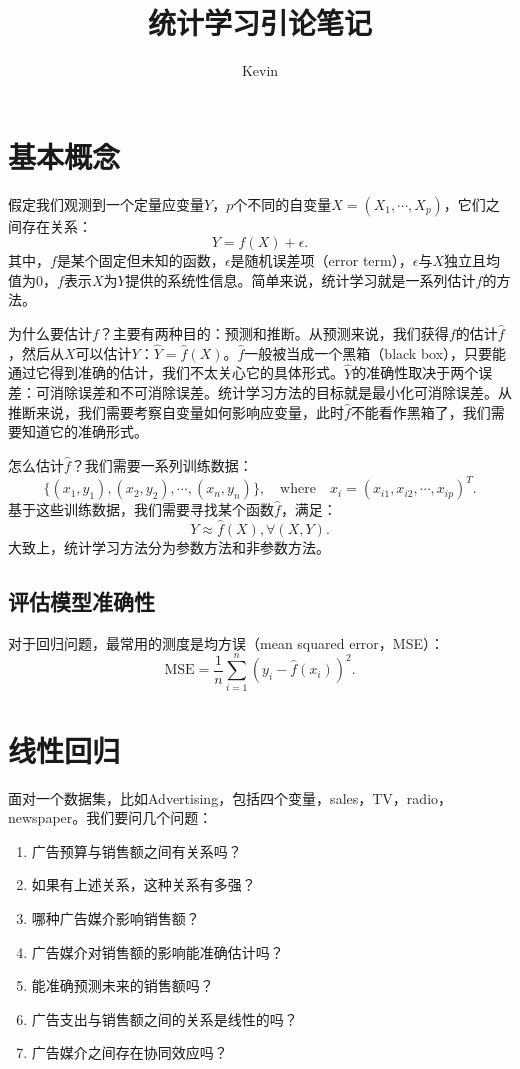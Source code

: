 \documentclass[hyperref,]{ctexart}
\title{统计学习引论笔记}
\author{Kevin}
\date{}
\providecommand{\tightlist}{%
  \setlength{\itemsep}{0pt}\setlength{\parskip}{0pt}}
\begin{document}
\maketitle

{
\setcounter{tocdepth}{2}
\tableofcontents
}
\section{基本概念}

假定我们观测到一个定量应变量\(Y\)，\(p\)个不同的自变量\(X=(X_1,\cdots,X_p)\)，它们之间存在关系：
\[Y=f(X)+\epsilon.\]
其中，\(f\)是某个固定但未知的函数，\(\epsilon\)是随机误差项（error
term），\(\epsilon\)与\(X\)独立且均值为0，\(f\)表示\(X\)为\(Y\)提供的系统性信息。简单来说，统计学习就是一系列估计\(f\)的方法。

为什么要估计\(f\)？主要有两种目的：预测和推断。从预测来说，我们获得\(f\)的估计\(\hat{f}\)，然后从\(X\)可以估计\(Y\)：\(\hat{Y}=\hat{f}(X)\)。\(\hat{f}\)一般被当成一个黑箱（black
box），只要能通过它得到准确的估计，我们不太关心它的具体形式。\(\hat{Y}\)的准确性取决于两个误差：可消除误差和不可消除误差。统计学习方法的目标就是最小化可消除误差。从推断来说，我们需要考察自变量如何影响应变量，此时\(\hat{f}\)不能看作黑箱了，我们需要知道它的准确形式。

怎么估计\(\hat{f}\)？我们需要一系列训练数据：
\[\{(x_1,y_1),(x_2,y_2),\cdots,(x_n,y_n)\},\quad\mathrm{where}\quad x_i=(x_{i1},x_{i2},\cdots,x_{ip})^T.\]
基于这些训练数据，我们需要寻找某个函数\(\hat{f}\)，满足：
\[Y\approx \hat{f}(X),\forall (X,Y).\]
大致上，统计学习方法分为参数方法和非参数方法。

\subsection{评估模型准确性}

对于回归问题，最常用的测度是均方误（mean squared error，MSE）：
\[\mathrm{MSE}=\frac{1}{n}\sum_{i=1}^n(y_i-\hat{f}(x_i))^2.\]

\section{线性回归}

面对一个数据集，比如Advertising，包括四个变量，sales，TV，radio，newspaper。我们要问几个问题：

\begin{enumerate}
\def\labelenumi{\arabic{enumi}.}
\tightlist
\item
  广告预算与销售额之间有关系吗？
\item
  如果有上述关系，这种关系有多强？
\item
  哪种广告媒介影响销售额？
\item
  广告媒介对销售额的影响能准确估计吗？
\item
  能准确预测未来的销售额吗？
\item
  广告支出与销售额之间的关系是线性的吗？
\item
  广告媒介之间存在协同效应吗？
\end{enumerate}
\end{document}
